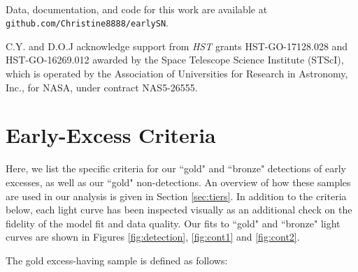 \documentclass[twocolumn,twocolappendix, linenumbers]{aastex631} %
\begin{document}
\\
Data, documentation, and code for this work are available at \texttt{github.com/Christine8888/earlySN}.



\begin{acknowledgements}
C.Y. and D.O.J acknowledge support from {\it HST} grants HST-GO-17128.028 and HST-GO-16269.012 awarded by the Space Telescope Science Institute (STScI), which is operated by the Association of Universities for Research in Astronomy, Inc., for NASA, under contract NAS5-26555.
\end{acknowledgements}

\appendix 
\section{Early-Excess Criteria}\label{sec:appendix}

Here, we list the specific criteria for our ``gold" and ``bronze" detections of early excesses, as well as our ``gold" non-detections.  An overview of how these samples are used in our analysis is given in Section \ref{sec:tiers}.  In addition to the criteria below, each light curve has been inspected visually as an additional check on the fidelity of the model fit and data quality.  Our fits to ``gold" and ``bronze" light curves are shown in Figures \ref{fig:detection}, \ref{fig:cont1} and \ref{fig:cont2}.

The gold excess-having sample is defined as follows:
\end{document}
